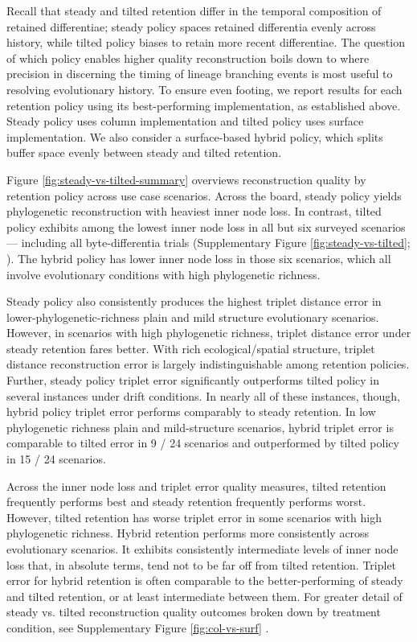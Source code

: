 

Recall that steady and tilted retention differ in the temporal composition of retained differentiae;
steady policy spaces retained differentia evenly across history, while tilted policy biases to retain more recent differentiae.
The question of which policy enables higher quality reconstruction boils down to where precision in discerning the timing of lineage branching events is most useful to resolving evolutionary history.
To ensure even footing, we report results for each retention policy using its best-performing implementation, as established above.
Steady policy uses column implementation and tilted policy uses surface implementation.
We also consider a surface-based hybrid policy, which splits buffer space evenly between steady and tilted retention.

Figure \ref{fig:steady-vs-tilted-summary} overviews reconstruction quality by retention policy across use case scenarios.
Across the board, steady policy yields phylogenetic reconstruction with heaviest inner node loss.
In contrast, tilted policy exhibits among the lowest inner node loss in all but six surveyed scenarios --- including all byte-differentia trials (Supplementary Figure \ref{fig:steady-vs-tilted}; \citep{moreno2024supplemental}).
The hybrid policy has lower inner node loss in those six scenarios, which all involve evolutionary conditions with high phylogenetic richness.

Steady policy also consistently produces the highest triplet distance error in lower-phylogenetic-richness plain and mild structure evolutionary scenarios.
However, in scenarios with high phylogenetic richness, triplet distance error under steady retention fares better.
With rich ecological/spatial structure, triplet distance reconstruction error is largely indistinguishable among retention policies.
Further, steady policy triplet error significantly outperforms tilted policy in several instances under drift conditions.
In nearly all of these instances, though, hybrid policy triplet error performs comparably to steady retention.
In low phylogenetic richness plain and mild-structure scenarios, hybrid triplet error is comparable to tilted error in 9 / 24 scenarios and outperformed by tilted policy in 15 / 24 scenarios.

Across the inner node loss and triplet error quality measures, tilted retention frequently performs best and steady retention frequently performs worst.
However, tilted retention has worse triplet error in some scenarios with high phylogenetic richness.
Hybrid retention performs more consistently across evolutionary scenarios.
It exhibits consistently intermediate levels of inner node loss that, in absolute terms, tend not to be far off from tilted retention.
Triplet error for hybrid retention is often comparable to the better-performing of steady and tilted retention, or at least intermediate between them.
For greater detail of steady vs. tilted reconstruction quality outcomes broken down by treatment condition, see Supplementary Figure \ref{fig:col-vs-surf} \citep{moreno2024supplemental}.

